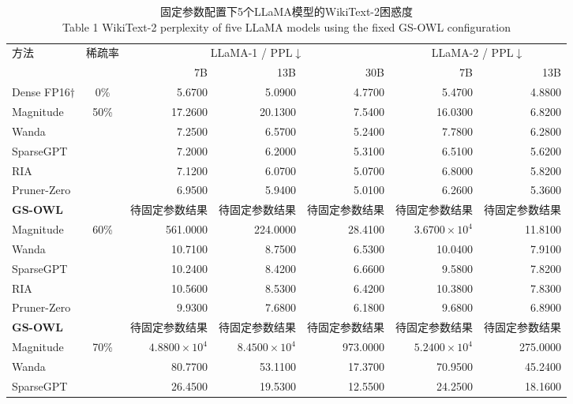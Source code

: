 \documentclass[UTF8,fontset=fandol]{ctexart}
\renewcommand{\arraystretch}{1.08}
\begin{document}
\begin{table}[!htbp]
\centering
\caption{固定参数配置下5个LLaMA模型的WikiText-2困惑度\\
Table 1 WikiText-2 perplexity of five LLaMA models using the fixed GS-OWL configuration}
\label{tab:ppl}
\scriptsize
\setlength{\tabcolsep}{4.2pt}
\renewcommand{\arraystretch}{0.96}
\begin{tabular*}{0.98\textwidth}{@{\extracolsep{\fill}}lcrrrrr@{}}
\toprule
\multirow{2}{*}{方法} & \multirow{2}{*}{稀疏率} &
\multicolumn{3}{c}{LLaMA-1 / PPL$\downarrow$} & \multicolumn{2}{c}{LLaMA-2 / PPL$\downarrow$} \\
\cmidrule(lr){3-5}\cmidrule(lr){6-7}
 & & 7B & 13B & 30B & 7B & 13B \\
\midrule
Dense FP16$\dagger$ & 0\% & 5.6700 & 5.0900 & 4.7700 & 5.4700 & 4.8800 \\
\midrule
Magnitude & \multirow{6}{*}{50\%} & 17.2600 & 20.1300 & 7.5400 & 16.0300 & 6.8200 \\
Wanda & & 7.2500 & 6.5700 & 5.2400 & 7.7800 & 6.2800 \\
SparseGPT & & 7.2000 & 6.2000 & 5.3100 & 6.5100 & 5.6200 \\
RIA & & 7.1200 & 6.0700 & 5.0700 & 6.8000 & 5.8200 \\
Pruner-Zero & & 6.9500 & 5.9400 & 5.0100 & 6.2600 & 5.3600 \\
\textbf{GS-OWL} & & 待固定参数结果 & 待固定参数结果 & 待固定参数结果 & 待固定参数结果 & 待固定参数结果 \\
\midrule
Magnitude & \multirow{6}{*}{60\%} & 561.0000 & 224.0000 & 28.4100 & $3.6700\times10^4$ & 11.8100 \\
Wanda & & 10.7100 & 8.7500 & 6.5300 & 10.0400 & 7.9100 \\
SparseGPT & & 10.2400 & 8.4200 & 6.6600 & 9.5800 & 7.8200 \\
RIA & & 10.5600 & 8.5300 & 6.4200 & 10.3800 & 7.8300 \\
Pruner-Zero & & 9.9300 & 7.6800 & 6.1800 & 9.6800 & 6.8900 \\
\textbf{GS-OWL} & & 待固定参数结果 & 待固定参数结果 & 待固定参数结果 & 待固定参数结果 & 待固定参数结果 \\
\midrule
  Magnitude & \multirow{11}{*}{70\%} & $4.8800\times10^4$ & $8.4500\times10^4$ & 973.0000 & $5.2400\times10^4$ & 275.0000 \\
  Wanda & & 80.7700 & 53.1100 & 17.3700 & 70.9500 & 45.2400 \\
  SparseGPT & & 26.4500 & 19.5300 & 12.5500 & 24.2500 & 18.1600 \\

\end{tabular*}
\end{table}
\end{document}
